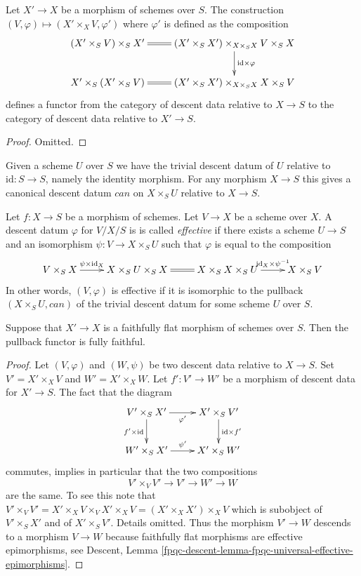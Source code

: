 \begin{lemma}
\label{lemma-pullback}
Let $X' \to X$ be a morphism of schemes over $S$.
The construction
$(V, \varphi) \mapsto
(X' \times_X V, \varphi')$
where $\varphi'$ is defined as the composition
$$
\xymatrix{
(X' \times_S V) \times_S X' \ar@{=}[r] &
(X' \times_S X') \times_{X \times_S X} V \times_S X
\ar[d]^{\text{id} \times \varphi} \\
X' \times_S (X' \times_S V) &
(X' \times_S X') \times_{X \times_S X} X \times_S V \ar@{=}[l]
}
$$
defines a functor from the category of descent data
relative to $X \to S$ to the category of descent data
relative to $X' \to S$.
\end{lemma}

\begin{proof}
Omitted.
\end{proof}

\noindent
Given a scheme $U$ over $S$ we have the trivial
descent datum of $U$ relative to $\text{id} : S \to S$,
namely the identity morphism.
For any morphism $X \to S$ this gives a canonical descent
datum $can$ on $X \times_S U$ relative to $X \to S$.

\begin{definition}
\label{definition-effective}
Let $f : X \to S$ be a morphism of schemes.
Let $V \to X$ be a scheme over $X$.
A descent datum $\varphi$ for $V/X/S$ is
is called {\it effective} if there exists a 
scheme $U \to S$ and an isomorphism $\psi : V \to X \times_S U$
such that $\varphi$ is equal to the composition
$$
\xymatrix{
V \times_S X \ar[r]^-{\psi \times \text{id}_X} &
X \times_S U \times_S X \ar@{=}[r] &
X \times_S X \times_S U 
\ar[r]^-{\text{id}_X \times \psi^{-1}} &
X \times_S V
}
$$
In other words, $(V, \varphi)$ is effective if it is
isomorphic to the pullback $(X \times_S U, can)$ of the trivial descent datum
for some scheme $U$ over $S$.
\end{definition}

\begin{lemma}
\label{lemma-fully-faithful}
Suppose that $X' \to X$ is a faithfully flat morphism of schemes over $S$.
Then the pullback functor is fully faithful.
\end{lemma}

\begin{proof}
Let $(V, \varphi)$ and $(W, \psi)$ be two descent data relative
to $X \to S$. Set $V' = X' \times_X V$ and $W' = X' \times_X W$.
Let $f' : V' \to W'$ be a morphism of descent data for $X' \to S$.
The fact that the diagram 
$$
\xymatrix{
V' \times_S X' \ar[r]_{\varphi'} \ar[d]_{f' \times \text{id}} &
X' \times_S V' \ar[d]^{\text{id} \times f'} \\
W' \times_S X' \ar[r]^{\psi'} & X' \times_S W'
}
$$
commutes, implies in particular that the two compositions
$$
V' \times_V V' \to V' \to W' \to W
$$
are the same. To see this note that
$V' \times_V V' = X' \times_X V \times_V X' \times_X V
= (X' \times_X X') \times_X V$ which is subobject
of $V' \times_S X'$ and of $X' \times_S V'$.
Details omitted. Thus the morphism $V' \to W$ descends to
a morphism $V \to W$ because faithfully flat morphisms
are effective epimorphisms, see Descent, 
Lemma \ref{fpqc-descent-lemma-fpqc-universal-effective-epimorphisms}.
\end{proof}


